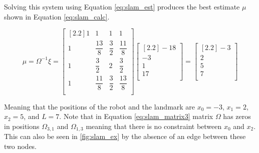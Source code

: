 Solving this system using Equation \ref{eq:slam_est} produces the best estimate $\mu$ shown in Equation \ref{eq:slam_calc}.

\begin{equation}
\label{eq:slam_calc}
\mu = \Omega^{-1}\xi = 
\begin{bmatrix}[2.2]
1 & 1 & 1 & 1 \\
1 & \dfrac{13}{8} & \dfrac{3}{2} & \dfrac{11}{8} \\
1 & \dfrac{3}{2} & 2 & \dfrac{3}{2} \\
1 & \dfrac{11}{8} & \dfrac{3}{2} & \dfrac{13}{8} \\
\end{bmatrix}
\begin{bmatrix}[2.2]
-18 \\
-3 \\
1 \\
17 \\
\end{bmatrix} =
\begin{bmatrix}[2.2]
-3 \\
2 \\
5 \\
7 \\
\end{bmatrix}
\end{equation}

Meaning that the positions of the robot and the landmark are $x_0 = -3$, $x_1 = 2$, $x_2 = 5$, and $L = 7$. Note that in Equation \ref{eq:slam_matrix3} matrix $\Omega$ has zeros in positions $\Omega_{3,1}$ and $\Omega_{1,3}$ meaning that there is no constraint between $x_0$ and $x_2$. This can also be seen in \autoref{fig:slam_ex} by the absence of an edge between these two nodes.
